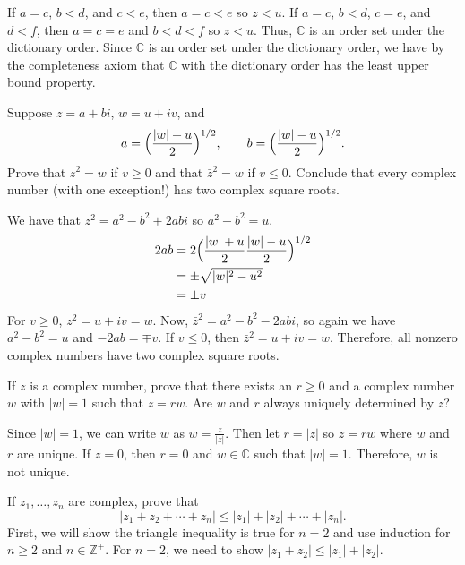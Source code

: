 \begin{exercise}
  If \(a = c\), \(b < d\), and \(c < e\), then \(a = c < e\) so \(z < u\).
  If \(a = c\), \(b < d\), \(c = e\), and \(d < f\), then \(a = c = e\) and
  \(b < d < f\) so \(z < u\).
  Thus, \(\mathbb{C}\) is an order set under the dictionary order.
  Since \(\mathbb{C}\) is an order set under the dictionary order, we have by
  the completeness axiom that \(\mathbb{C}\) with the dictionary order has the
  least upper bound property.
\item
  Suppose \(z = a + bi\), \(w = u + iv\), and
  \[
  a = \Bigl(\frac{\lvert w\rvert + u}{2}\Bigr)^{1/2},\qquad
  b = \Bigl(\frac{\lvert w\rvert - u}{2}\Bigr)^{1/2}.
  \]
  Prove that \(z^2 = w\) if \(v\geq 0\) and that \(\bar{z}^2 = w\) if
  \(v\leq 0\).
  Conclude that every complex number (with one exception!) has two complex
  square roots.
  \par\smallskip
  We have that \(z^2 = a^2 - b^2 + 2abi\) so \(a^2 - b^2 = u\).
  \begin{align*}
    2ab & = 2\Bigl(\frac{\lvert w\rvert + u}{2}
          \frac{\lvert w\rvert - u}{2}\Bigr)^{1/2}\\
        & = \pm\sqrt{\lvert w\rvert^2 - u^2}\\
        & = \pm v
  \end{align*}
  For \(v \geq 0\), \(z^2 = u + iv = w\).
  Now, \(\bar{z}^2 = a^2 - b^2 - 2abi\), so again we have \(a^2 - b^2 = u\) and
  \(-2ab = \mp v\).
  If \(v \leq 0\), then \(\bar{z}^2 = u + iv = w\).
  Therefore, all nonzero complex numbers have two complex square roots.
\item
  If \(z\) is a complex number, prove that there exists an \(r\geq 0\) and a
  complex number \(w\) with \(\lvert w\rvert = 1\) such that \(z = rw\).
  Are \(w\) and \(r\) always uniquely determined by \(z\)?
  \par\smallskip
  Since \(\lvert w\rvert = 1\), we can write \(w\) as
  \(w = \frac{z}{\lvert z\rvert}\).
  Then let \(r = \lvert z\rvert\) so \(z = rw\) where \(w\) and \(r\) are
  unique.
  If \(z = 0\), then \(r = 0\) and \(w\in\mathbb{C}\) such that
  \(\lvert w\rvert = 1\).
  Therefore, \(w\) is not unique.
\item
  If \(z_1,\ldots, z_n\) are complex, prove that
  \[
  \lvert z_1 + z_2 + \cdots + z_n\rvert\leq\lvert z_1\rvert + \lvert z_2\rvert
  + \cdots + \lvert z_n\rvert.
  \]
  First, we will show the triangle inequality is true for \(n = 2\) and use
  induction for \(n\geq 2\) and \(n\in\mathbb{Z}^+\).
  For \(n = 2\), we need to show
  \(\lvert z_1 + z_2\rvert\leq\lvert z_1\rvert + \lvert z_2\rvert\).

\end{exercise}
